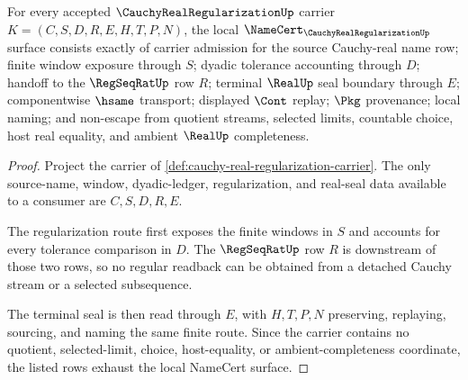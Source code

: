\begin{theorem}
\label{thm:cauchy-real-regularization-namecert-obligations}
For every accepted $\CauchyRealRegularizationUp$ carrier $K=(C,S,D,R,E,H,T,P,N)$, the local $\NameCert_{\CauchyRealRegularizationUp}$ surface consists exactly of carrier admission for the source Cauchy-real name row; finite window exposure through $S$; dyadic tolerance accounting through $D$; handoff to the $\RegSeqRatUp$ row $R$; terminal $\RealUp$ seal boundary through $E$; componentwise $\hsame$ transport; displayed $\Cont$ replay; $\Pkg$ provenance; local naming; and non-escape from quotient streams, selected limits, countable choice, host real equality, and ambient $\RealUp$ completeness.
\end{theorem}
\begin{proof}
Project the carrier of \autoref{def:cauchy-real-regularization-carrier}. The only source-name, window, dyadic-ledger, regularization, and real-seal data available to a consumer are $C,S,D,R,E$.

The regularization route first exposes the finite windows in $S$ and accounts for every tolerance comparison in $D$. The $\RegSeqRatUp$ row $R$ is downstream of those two rows, so no regular readback can be obtained from a detached Cauchy stream or a selected subsequence.

The terminal seal is then read through $E$, with $H,T,P,N$ preserving, replaying, sourcing, and naming the same finite route. Since the carrier contains no quotient, selected-limit, choice, host-equality, or ambient-completeness coordinate, the listed rows exhaust the local NameCert surface.
\end{proof}


\begin{closurestatus}{\CauchyRealRegularizationUp}
  \theoryclosure{\seedClosure}
  \formalstatus{\unformalizedV}
\end{closurestatus}
